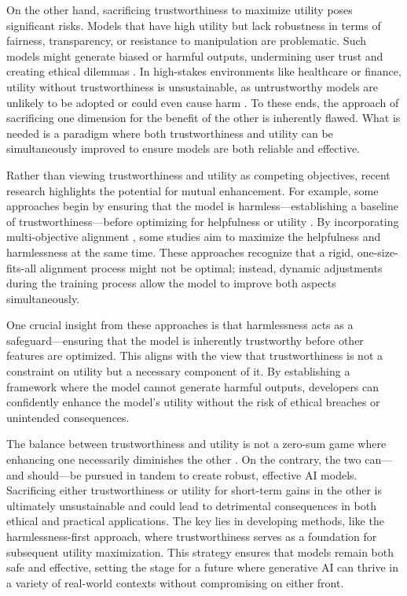 On the  other hand, sacrificing trustworthiness to maximize utility poses significant risks. Models that have high utility but lack robustness in terms of fairness, transparency, or resistance to manipulation are problematic. Such models might generate biased or harmful outputs, undermining user trust and creating ethical dilemmas \cite{huang2024position, liu2023trustworthy, wang2023decodingtrust}. In high-stakes environments like healthcare or finance, utility without trustworthiness is unsustainable, as untrustworthy models are unlikely to be adopted or could even cause harm \cite{xia2024cares}. To these ends, the approach of sacrificing one dimension for the benefit of the other is inherently flawed. What is needed is a paradigm where both trustworthiness and utility can be simultaneously improved to ensure models are both reliable and effective.

Rather than viewing trustworthiness and utility as competing objectives, recent research highlights the potential for mutual enhancement. For example, some approaches begin by ensuring that the model is harmless—establishing a baseline of trustworthiness—before optimizing for helpfulness or utility \cite{gao2024best}. By incorporating multi-objective alignment \cite{yang2024metaaligner, wang2024hybrid, zhou-etal-2024-beyond, fu2024unlocking}, some studies aim to maximize the helpfulness and harmlessness at the same time. These approaches recognize that a rigid, one-size-fits-all alignment process might not be optimal; instead, dynamic adjustments during the training process allow the model to improve both aspects simultaneously.

One crucial insight from these approaches is that harmlessness acts as a safeguard—ensuring that the model is inherently trustworthy before other features are optimized. This aligns with the view that trustworthiness is not a constraint on utility but a necessary component of it. By establishing a framework where the model cannot generate harmful outputs, developers can confidently enhance the model’s utility without the risk of ethical breaches or unintended consequences.

The balance between trustworthiness and utility is not a zero-sum game where enhancing one necessarily diminishes the other \cite{tuan2024towards}. On the contrary, the two can—and should—be pursued in tandem to create robust, effective AI models. Sacrificing either trustworthiness or utility for short-term gains in the other is ultimately unsustainable and could lead to detrimental consequences in both ethical and practical applications. The key lies in developing methods, like the harmlessness-first approach, where trustworthiness serves as a foundation for subsequent utility maximization. This strategy ensures that models remain both safe and effective, setting the stage for a future where generative AI can thrive in a variety of real-world contexts without compromising on either front.




